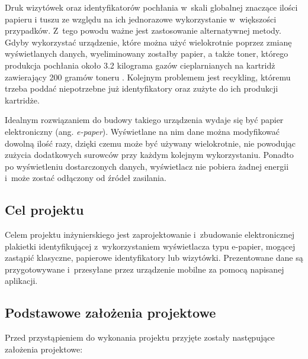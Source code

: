 \documentclass[a4paper,12pt, twoside]{article}
\begin{document}
    	Druk wizytówek oraz identyfikatorów pochłania w~skali globalnej znaczące ilości papieru i tuszu ze względu na ich jednorazowe wykorzystanie w~większości przypadków. Z~tego powodu ważne jest zastosowanie alternatywnej metody. Gdyby wykorzystać urządzenie, które można użyć wielokrotnie poprzez zmianę wyświetlanych danych, wyeliminowany zostałby papier, a także toner, którego produkcja pochłania około 3.2 kilograma gazów cieplarnianych na kartridż zawierający 200 gramów toneru \cite{cartidge_production}. Kolejnym problemem jest recykling, któremu trzeba poddać niepotrzebne już identyfikatory oraz zużyte do ich produkcji kartridże.
    	
    	Idealnym rozwiązaniem do budowy takiego urządzenia wydaje się być papier elektroniczny (ang. \textit{e-paper}). Wyświetlane na nim dane można modyfikować dowolną ilość razy, dzięki czemu może być używany wielokrotnie, nie powodując zużycia dodatkowych surowców przy każdym kolejnym wykorzystaniu. Ponadto po wyświetleniu dostarczonych danych, wyświetlacz nie pobiera żadnej energii i~może zostać odłączony od źródeł zasilania.

    	\subsection{Cel projektu}
    	Celem projektu inżynierskiego jest zaprojektowanie i~zbudowanie elektronicznej plakietki identyfikującej z~wykorzystaniem wyświetlacza typu e-papier, mogącej zastąpić klasyczne, papierowe identyfikatory lub wizytówki. Prezentowane dane są przygotowywane i~przesyłane przez urządzenie mobilne za pomocą napisanej aplikacji.

        \newpage
    	\subsection{Podstawowe założenia projektowe}
    	Przed przystąpieniem do wykonania projektu przyjęte zostały następujące założenia projektowe:
    	
\end{document}
